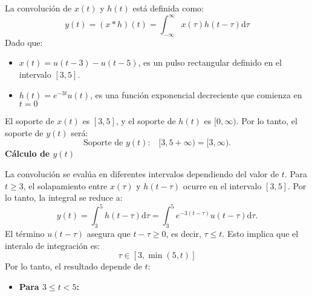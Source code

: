 \begin{enumerate}[label=\color{red}\textbf{\arabic*)}]
\begin{enumerate}[label=\color{red}\textbf{\alph*)}]
      La convolución de $x(t)$ y  $h(t)$ está definida como:  \[
      y(t)=(x\ast h)(t)=\int_{-\infty}^{\infty} x(\tau)h(t-\tau)\mathrm{d}\tau 
      \] 
      Dado que:
      \begin{itemize}[label=\textbullet]
          \item $x(t)=u(t-3)-u(t-5)$, es un pulso rectangular definido en el intervalo  $[3,5]$.
          \item  $h(t)=e^{-3t}u(t) $, es una función exponencial decreciente que comienza en $t=0$
      \end{itemize}
      \begin{center}
          \qquad
      \end{center}
      El soporte de $x(t)$ es  $[3,5]$, y el soporte de  $h(t)$ es  $[0,\infty)$. Por lo tanto, el soporte de  $y(t)$ será:  \[
          \text{Soporte de $y(t)$:}\quad[3,5+\infty)=[3,\infty).
      \] 
      \textbf{Cálculo de $y(t)$} 

      La convolución se evalúa en diferentes intervalos dependiendo del valor de $t$. Para  $t\ge 3$, el solapamiento entre $x(\tau)$ y  $h(t-\tau)$ ocurre en el intervalo  $[3,5]$. Por lo tanto, la integral se reduce a:  \[
      y(t)=\int_{3}^{5} h(t-\tau)\mathrm{d}\tau=\int_{3}^{5} e^{-3(t-\tau)}u(t-\tau)\mathrm{d}\tau.
      \] 
      El término $u(t-\tau)$ asegura que  $t-\tau\ge 0$, es decir, $\tau\le t$. Esto implica que el interalo de integración es: \[
          \tau\in [3,\min(5,t)]
      \] 
      Por lo tanto, el resultado depende de $t$:
       \begin{itemize}[label=\textbullet]
          \item \textbf{Para $3\le t<5$:}


\end{itemize}
\end{enumerate}
\end{enumerate}
